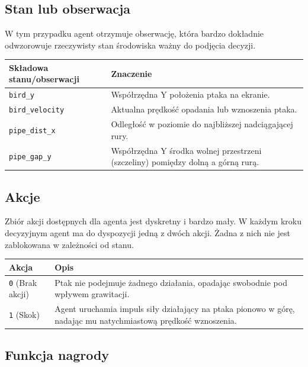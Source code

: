 \documentclass[12pt]{article}
\begin{document}
\subsection{Stan lub obserwacja}

W tym przypadku agent otrzymuje obserwację, która bardzo dokładnie odwzorowuje rzeczywisty stan środowiska ważny do podjęcia decyzji.

\begin{center}
\begin{tabular}{p{}p{}}
\toprule
Składowa stanu/obserwacji & Znaczenie \\
\midrule
\texttt{bird\_y} & Współrzędna Y położenia ptaka na ekranie. \\
\texttt{bird\_velocity} & Aktualna prędkość opadania lub wznoszenia ptaka. \\
\texttt{pipe\_dist\_x} & Odległość w poziomie do najbliższej nadciągającej rury. \\
\texttt{pipe\_gap\_y} & Współrzędna Y środka wolnej przestrzeni (szczeliny) pomiędzy dolną a górną rurą. \\
\bottomrule
\end{tabular}
\end{center}

\subsection{Akcje}

Zbiór akcji dostępnych dla agenta jest dyskretny i bardzo mały. W każdym kroku decyzyjnym agent ma do dyspozycji jedną z dwóch akcji. Żadna z nich nie jest zablokowana w zależności od stanu.

\begin{center}
\begin{tabular}{p{}p{}}
\toprule
Akcja & Opis \\
\midrule
\texttt{0} (Brak akcji) & Ptak nie podejmuje żadnego działania, opadając swobodnie pod wpływem grawitacji. \\
\texttt{1} (Skok) & Agent uruchamia impuls siły działający na ptaka pionowo w górę, nadając mu natychmiastową prędkość wznoszenia. \\
\bottomrule
\end{tabular}
\end{center}

\subsection{Funkcja nagrody}
\end{document}
